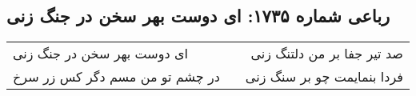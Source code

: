 \begin{center}
\section*{رباعی شماره ۱۷۳۵: ای دوست بهر سخن در جنگ زنی}
\label{sec:1735}
\begin{longtable}{l p{0.5cm} r}
ای دوست بهر سخن در جنگ زنی
&&
صد تیر جفا بر من دلتنگ زنی
\\
در چشم تو من مسم دگر کس زر سرخ
&&
فردا بنمایمت چو بر سنگ زنی
\\
\end{longtable}
\end{center}
